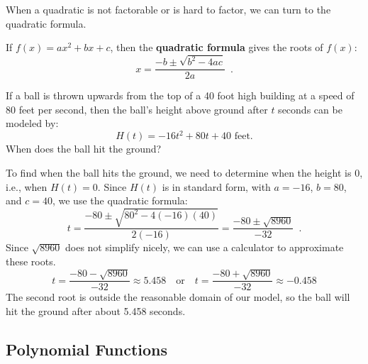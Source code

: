 When a quadratic is not factorable or is hard to factor, we can turn to the quadratic formula.

\begin{theorem}
If $f(x)=ax^2+bx+c$, then the {\bf quadratic formula} gives the roots of $f(x)$:
\[ x=\dfrac{-b\pm \sqrt{b^2-4ac}}{2a} \enspace .\]
\end{theorem}

\begin{example}
If a ball is thrown upwards from the top of a 40 foot high building at a speed of 80 feet per second, then the ball's height above ground after $t$ seconds can be modeled by:
$$H(t)=-16t^2+80t+40 \mbox{ feet.}$$
When does the ball hit the ground?

\begin{solution} To find when the ball hits the ground, we need to determine when the height is 0, i.e., when $H(t)=0$. Since $H(t)$ is in standard form, with $a=-16$, $b=80$, and $c=40$, we use the quadratic formula:
\[ t=\dfrac{-80\pm \sqrt{80^2-4(-16)(40)}}{2(-16)}=\dfrac{-80\pm\sqrt{8960}}{-32} \enspace .\]
Since $\sqrt{8960}$ does not simplify nicely, we can use a calculator to approximate these roots.
\[ t=\dfrac{-80-\sqrt{8960}}{-32}\approx 5.458 \quad\text{or}\quad t=\dfrac{-80+\sqrt{8960}}{-32}\approx -0.458 \]
The second root is outside the reasonable domain of our model, so the ball will hit the ground after about 5.458 seconds.
\end{solution}\end{example}

\subsection{Polynomial Functions}
\label{ssec:polynomial}

